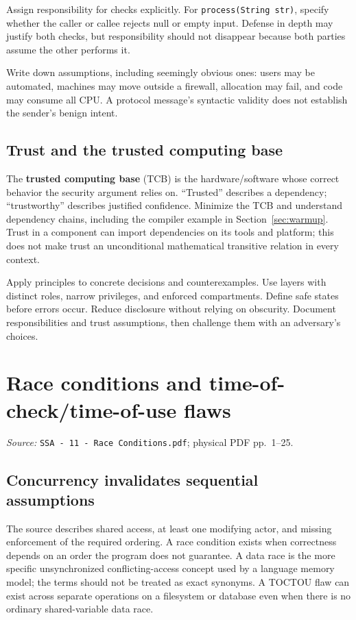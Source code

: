 \documentclass[11pt,a4paper]{article}
\newcommand{\currentmodule}{Contents}
\newcommand{\source}[2]{\textcolor{muted}{\small\textit{Source:} \nolinkurl{#1}; physical PDF pp.~#2.}\par\medskip}
\newcommand{\module}[2]{\par\Needspace{8\baselineskip}\gdef\currentmodule{#1}\section{#1}\label{#2}}
\numberwithin{figure}{section}
\begin{document}
Assign responsibility for checks explicitly. For \texttt{process(String str)}, specify whether the caller or callee rejects null or empty input. Defense in depth may justify both checks, but responsibility should not disappear because both parties assume the other performs it.

Write down assumptions, including seemingly obvious ones: users may be automated, machines may move outside a firewall, allocation may fail, and code may consume all CPU. A protocol message's syntactic validity does not establish the sender's benign intent.

\subsection{Trust and the trusted computing base}
The \textbf{trusted computing base} (TCB) is the hardware/software whose correct behavior the security argument relies on. ``Trusted'' describes a dependency; ``trustworthy'' describes justified confidence. Minimize the TCB and understand dependency chains, including the compiler example in Section~\ref{sec:warmup}. Trust in a component can import dependencies on its tools and platform; this does not make trust an unconditional mathematical transitive relation in every context.

\begin{takeaway}
Apply principles to concrete decisions and counterexamples. Use layers with distinct roles, narrow privileges, and enforced compartments. Define safe states before errors occur. Reduce disclosure without relying on obscurity. Document responsibilities and trust assumptions, then challenge them with an adversary's choices.
\end{takeaway}

\module{Race conditions and time-of-check/time-of-use flaws}{sec:race}
\source{SSA - 11 - Race Conditions.pdf}{1--25}
\subsection{Concurrency invalidates sequential assumptions}
The source describes shared access, at least one modifying actor, and missing enforcement of the required ordering. A race condition exists when correctness depends on an order the program does not guarantee. A data race is the more specific unsynchronized conflicting-access concept used by a language memory model; the terms should not be treated as exact synonyms. A TOCTOU flaw can exist across separate operations on a filesystem or database even when there is no ordinary shared-variable data race.
\end{document}
